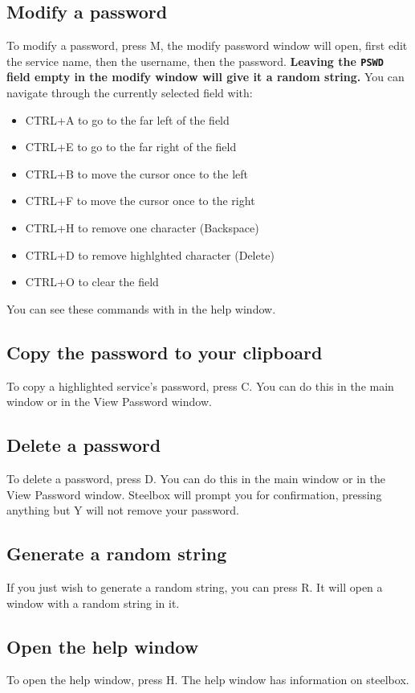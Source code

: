 \documentclass{article}
\begin{document}
  \subsection{Modify a password}
  To modify a password, press M, the modify password window will open, first edit the service name, then the username,
  then the password. \textbf{Leaving the \texttt{PSWD} field empty in the modify window will give it a random string.}
  You can navigate through the currently selected field with:
  \begin{itemize}
    \item CTRL+A to go to the far left of the field  
    \item CTRL+E to go to the far right of the field
    \item CTRL+B to move the cursor once to the left
    \item CTRL+F to move the cursor once to the right
    \item CTRL+H to remove one character (Backspace)
    \item CTRL+D to remove highlghted character (Delete)
    \item CTRL+O to clear the field
  \end{itemize}
  You can see these commands with in the help window.

  \subsection{Copy the password to your clipboard}
  To copy a highlighted service's password, press C. You can do this in the main window or in the View Password window.

  \subsection{Delete a password}
  To delete a password, press D. You can do this in the main window or in the View Password window. Steelbox will prompt you for
  confirmation, pressing anything but Y will not remove your password.

  \subsection{Generate a random string}
  If you just wish to generate a random string, you can press R. It will open a window with a random string in it.

  \subsection{Open the help window}
  To open the help window, press H. The help window has information on steelbox.
\end{document}
